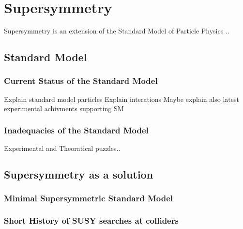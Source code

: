 \chapter{Supersymmetry}
Supersymmetry is an extension of the Standard Model of Particle Physics ..
\section{Standard Model}
\label{sec:StandardModel}
\subsection{Current Status of the Standard Model}
Explain standard model particles
Explain interations
Maybe explain also latest experimental achivments supporting SM
\subsection{Inadequacies of the Standard Model}
Experimental and Theoratical puzzles..
\section{Supersymmetry as a solution}
\subsection{Minimal Supersymmetric Standard Model}
\subsection{Short History of SUSY searches at colliders}

